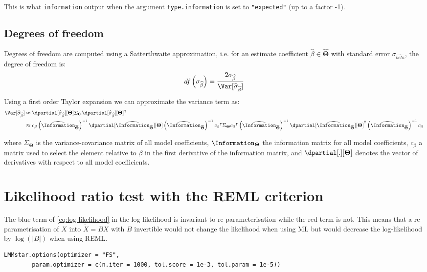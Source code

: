 \documentclass[12pt]{article}
\newcommand\trans[1]{{#1}^\intercal}%
\newcommand{\param}{\Theta}
\newcommand{\Vparam}{\boldsymbol{\param}}
\begin{document}
This is what \texttt{information} output when the argument \texttt{type.information}
is set to \texttt{"expected"} (up to a factor -1).

\clearpage

\subsection{Degrees of freedom}
\label{sec:orgfad5128}

Degrees of freedom are computed using a Satterthwaite approximation,
i.e. for an estimate coefficient \(\widehat{\beta}\in\widehat{\Vparam}\) with standard
error \(\sigma_{\widehat{beta}}\), the degree of freedom is:
\begin{align*}
df\left(\sigma_{\widehat{\beta}}\right) = \frac{2 \sigma_{\widehat{\beta}}}{\Var[\widehat{\sigma}_{\widehat{\beta}}]}
\end{align*}
Using a first order Taylor expansion we can approximate the variance term as:
\begin{align*}
\Var[\widehat{\sigma}_{\widehat{\beta}}] & \approx \dpartial[\widehat{\sigma}_{\widehat{\beta}}][\Vparam] \Sigma_{\Vparam}  \trans{\dpartial[\widehat{\sigma}_{\widehat{\beta}}][\Vparam]} \\
& \approx c_{\beta} \left(\widehat{\Information}_{\widehat{\Vparam}}\right)^{-1} \dpartial[\widehat{\Information}_{\widehat{\Vparam}}][\Vparam] \left(\widehat{\Information}_{\widehat{\Vparam}}\right)^{-1} \trans{c_{\beta}} \Sigma_{\Vparam} \trans{c_{\beta}} \left(\widehat{\Information}_{\widehat{\Vparam}}\right)^{-1} \trans{\dpartial[\widehat{\Information}_{\widehat{\Vparam}}][\Vparam]} \left(\widehat{\Information}_{\widehat{\Vparam}}\right)^{-1} c_{\beta}
\end{align*}

where \(\Sigma_{\Vparam}\) is the variance-covariance matrix of all
model coefficients, \(\Information_{\Vparam}\) the information
matrix for all model coefficients, \(c_{\beta}\) a matrix used to
select the element relative to \(\beta\) in the first derivative of
the information matrix, and \(\dpartial[.][\Vparam]\) denotes the
vector of derivatives with respect to all model coefficients.

\clearpage

\section{Likelihood ratio test with the REML criterion}
\label{SM:LRT-REML}
The blue term of \autoref{eq:log-likelihood} in the log-likelihood is
invariant to re-parameterisation while the red term is not. This means
that a re-parametrisation of \(X\) into \(\tilde{X} = B X\) with \(B\)
invertible would not change the likelihood when using ML but would
decrease the log-likelihood by \(\log(|B|)\) when using REML. 
\lstset{language=r,label= ,caption= ,captionpos=b,numbers=none}
\begin{lstlisting}
LMMstar.options(optimizer = "FS",
		param.optimizer = c(n.iter = 1000, tol.score = 1e-3, tol.param = 1e-5))
\end{lstlisting}
\end{document}

